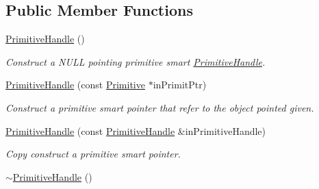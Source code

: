 \subsection*{Public Member Functions}
\begin{DoxyCompactItemize}
\item 
\hypertarget{classPuppy_1_1PrimitiveHandle_afc2b75ba067b8030f997dfd1577ad189}{}\hyperlink{classPuppy_1_1PrimitiveHandle_afc2b75ba067b8030f997dfd1577ad189}{Primitive\+Handle} ()\label{classPuppy_1_1PrimitiveHandle_afc2b75ba067b8030f997dfd1577ad189}

\begin{DoxyCompactList}\small\item\em Construct a N\+U\+L\+L pointing primitive smart \hyperlink{classPuppy_1_1PrimitiveHandle}{Primitive\+Handle}. \end{DoxyCompactList}\item 
\hyperlink{classPuppy_1_1PrimitiveHandle_adfe32a81fdb0ff32a4bc9be018944531}{Primitive\+Handle} (const \hyperlink{classPuppy_1_1Primitive}{Primitive} $\ast$in\+Primit\+Ptr)
\begin{DoxyCompactList}\small\item\em Construct a primitive smart pointer that refer to the object pointed given. \end{DoxyCompactList}\item 
\hyperlink{classPuppy_1_1PrimitiveHandle_aa512ff37494d12d450b61814827939b3}{Primitive\+Handle} (const \hyperlink{classPuppy_1_1PrimitiveHandle}{Primitive\+Handle} \&in\+Primitive\+Handle)
\begin{DoxyCompactList}\small\item\em Copy construct a primitive smart pointer. \end{DoxyCompactList}\item 
\hypertarget{classPuppy_1_1PrimitiveHandle_a8554d88db5964a0a6b125360c97efc44}{}\hyperlink{classPuppy_1_1PrimitiveHandle_a8554d88db5964a0a6b125360c97efc44}{$\sim$\+Primitive\+Handle} ()\label{classPuppy_1_1PrimitiveHandle_a8554d88db5964a0a6b125360c97efc44}


\end{DoxyCompactItemize}
